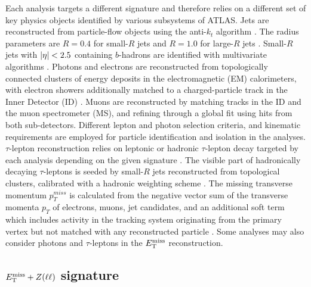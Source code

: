 Each analysis targets a different signature and therefore relies on a different set of key physics objects identified by various subsystems of ATLAS. Jets are reconstructed from particle-flow objects using the anti-$k_t$ algorithm \cite{Cacciari:2008gp,Fastjet, PERF-2015-09}. The radius parameters are $R=0.4$ for small-$R$ jets and $R=1.0$ for large-$R$ jets \cite{JETM-2018-05}. Small-$R$ jets with $\abs{\eta}<2.5$ containing $b$-hadrons are identified with multivariate algorithms \cite{FTAG-2019-07,FTAG-2018-01}. Photons and electrons are reconstructed from topologically connected clusters of energy deposits in the electromagnetic (EM) calorimeters, with electron showers additionally matched to a charged-particle track in the Inner Detector (ID) \cite{EGAM-2018-01,ATL-PHYS-PUB-2017-022}. Muons are reconstructed by matching tracks in the ID and the muon spectrometer (MS), and refining through a global fit using hits from both sub-detectors\cite{PERF-2015-10}. Different lepton and photon selection criteria, and kinematic requirements are employed for particle identification and isolation in the analyses. $\tau$-lepton reconstruction relies on leptonic or hadronic $\tau$-lepton decay targeted by each analysis depending on the given signature \cite{ATL-PHYS-PUB-2015-045,ATLAS-CONF-2017-029}. The visible part of hadronically decaying $\tau$-leptons is seeded by small-$R$ jets reconstructed from topological clusters, calibrated with a hadronic weighting scheme \cite{Barillari:1112035}. The missing transverse momentum $p_T^{miss}$ is calculated from the negative vector sum of the transverse momenta $p_T$ of electrons, muons, jet candidates, and an additional soft term which includes activity in the tracking system originating from the primary vertex but not matched with any reconstructed particle \cite{PERF-2016-07}. Some analyses may also consider photons and $\tau$-leptons in the $E_{\mathrm{T}}^{\mathrm{miss}}$ reconstruction.

\subsection{\texorpdfstring{$E_{\mathrm{T}}^{\mathrm{miss}}+Z(\ell\ell)$}{TEXT} signature}

